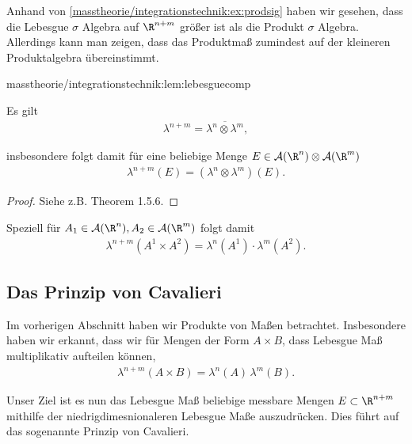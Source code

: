 \documentclass[letterpaper,10pt,german]{jupyterBook}
\begin{document}
\par
Anhand von \cref{masstheorie/integrationstechnik:ex:prodsig} haben wir gesehen, dass die Lebesgue \(\sigma\) Algebra auf \(\R^{n+m}\) größer ist als die Produkt \(\sigma\) Algebra. Allerdings kann man zeigen, dass das Produktmaß zumindest auf der kleineren Produktalgebra übereinstimmt.
\begin{lemma}{}{masstheorie/integrationstechnik:lem:lebesguecomp}



\par
Es gilt
\begin{align*}
\lambda^{n+m} = \overline{\lambda^n\otimes\lambda^m},
\end{align*}
\par
insbesondere folgt damit für eine beliebige Menge \(E\in \mathcal{A}(\R^n)\otimes\mathcal{A}(\R^m)\)
\begin{align*}
\lambda^{n+m}(E) = (\lambda^n\otimes\lambda^m)(E).
\end{align*}\end{lemma}

\begin{proof}
 Siehe z.B. \cite{Bog07} Theorem 1.5.6.
\end{proof}

\par
Speziell für \(A_1\in\mathcal{A}(\R^n), A_2\in\mathcal{A}(\R^m)\) folgt damit
\begin{align*}
\lambda^{n+m}(A^1\times A^2)=\lambda^{n}(A^1)\cdot\lambda^{m}(A^2).
\end{align*}

\subsection{Das Prinzip von Cavalieri}
\label{\detokenize{masstheorie/integrationstechnik:das-prinzip-von-cavalieri}}
\par
Im vorherigen Abschnitt haben wir Produkte von Maßen betrachtet. Insbesondere haben wir erkannt, dass wir für Mengen der Form \(A\times B\), dass Lebesgue Maß multiplikativ aufteilen können,
\begin{align*}
\lambda^{n+m}(A\times B) = \lambda^n(A)\,\lambda^m(B).
\end{align*}
\par
Unser Ziel ist es nun das Lebesgue Maß beliebige messbare Mengen \(E\subset\R^{n+m}\) mithilfe der niedrigdimesnionaleren Lebesgue Maße auszudrücken. Dies führt auf das sogenannte Prinzip von Cavalieri.
\end{document}
